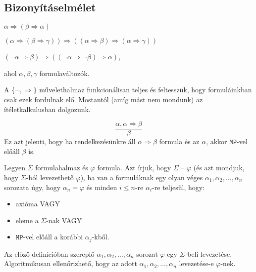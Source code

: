 \subsection{Bizonyításelmélet}
\begin{defi}
\begin{minipage}[t]{\linewidth}
\begin{Axiom}
\item $\alpha \Rightarrow (\beta \Rightarrow \alpha)$ \label{axi:one}
\item $(\alpha \Rightarrow (\beta \Rightarrow \gamma)) \Rightarrow ((\alpha \Rightarrow \beta) \Rightarrow (\alpha \Rightarrow \gamma))$
\item $(\lnot \alpha \Rightarrow \beta) \Rightarrow ((\lnot \alpha \Rightarrow \lnot \beta) \Rightarrow \alpha)$,
\end{Axiom}
\end{minipage}
ahol $\alpha, \beta, \gamma$ formulaváltozók.
\end{defi}
\begin{megj}
A $\lbrace \lnot, \Rightarrow \rbrace$ művelethalmaz funkcionálisan teljes és feltesszük, hogy formuláinkban csak ezek fordulnak elő. Mostantól (amíg mást nem mondunk) az ítéletkalkulusban dolgozunk.
\end{megj}
\begin{defi} $$\frac{\alpha, \alpha \Rightarrow \beta}{\beta}$$ Ez azt jelenti, hogy ha rendelkezésünkre áll $\alpha \Rightarrow \beta$ formula és az $\alpha$, akkor $\mathtt{MP}$-vel előáll $\beta$ is.
\end{defi}
\begin{defi}
Legyen $\Sigma$ formulahalmaz és $\varphi$ formula. Azt írjuk, hogy $\Sigma \vdash \varphi$ (és azt mondjuk, hogy $\Sigma$-ból levezethető $\varphi$), ha van a formuláknak egy olyan véges $\alpha_1, \alpha_2, \ldots, \alpha_n$ sorozata úgy, hogy $\alpha_n = \varphi$ és minden $i \leqslant n$-re $\alpha_i$-re teljesül, hogy:
\begin{itemize}
\item axióma VAGY
\item eleme a $\Sigma$-nak VAGY
\item $\mathtt{MP}$-vel előáll a korábbi $\alpha_j$-kből.
\end{itemize} 
\end{defi}
\begin{megj}
Az előző definícióban szereplő $\alpha_1, \alpha_2, \ldots, \alpha_n$ sorozat $\varphi$ egy $\Sigma$-beli levezetése. Algoritmikusan ellenőrizhető, hogy az adott $\alpha_1, \alpha_2, \ldots, \alpha_n$ levezetése-e $\varphi$-nek.
\end{megj}
